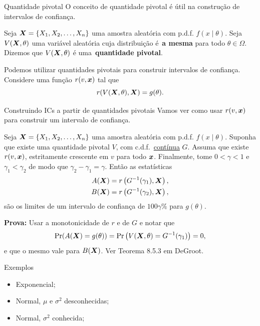 \begin{frame}{Quantidade pivotal}
 O conceito de quantidade pivotal é útil na construção de intervalos de confiança.
 \begin{defn}
 \label{def:pivotal_quantity}
   Seja $\boldsymbol{X} = \{ X_1, X_2, \ldots, X_n \}$ uma amostra aleatória com p.d.f. $f(x\mid \theta)$.
   Seja $V(\boldsymbol{X}, \theta)$ uma variável aleatória cuja distribuição é~\textbf{a mesma} para todo $\theta \in \Omega$.
   Dizemos que $V(\boldsymbol{X}, \theta)$ é uma~\textbf{quantidade pivotal}.
 \end{defn}
Podemos utilizar quantidades pivotais para construir intervalos de confiança.
Considere uma função $r(v, \boldsymbol{x})$ tal que
\[ r(V(\boldsymbol{X}, \theta), \boldsymbol{X}) = g(\theta). \]
\end{frame}

\begin{frame}{Construindo ICs a partir de quantidades pivotais}
 Vamos ver como usar $r(v, \boldsymbol{x})$ para construir um intervalo de confiança.
 \begin{theo}
 \label{thm:CIs_from_pivotal}
     Seja $\boldsymbol{X} = \{ X_1, X_2, \ldots, X_n \}$ uma amostra aleatória com p.d.f. $f(x\mid \theta)$.
     Suponha que existe uma quantidade pivotal $V$, com c.d.f.~\underline{contínua} $G$.
     Assuma que existe $r(v, \boldsymbol{x})$, estritamente crescente em $v$ para todo $\boldsymbol{x}$.
     Finalmente, tome $ 0 < \gamma < 1$ e $\gamma_1 < \gamma_2$ de modo que $\gamma_2 - \gamma_1 = \gamma$.
     Então as estatísticas
     \begin{align*}
      A(\boldsymbol{X}) = r\left(G^{-1}(\gamma_1), \boldsymbol{X} \right),\\
      B(\boldsymbol{X}) = r\left(G^{-1}(\gamma_2), \boldsymbol{X} \right),
     \end{align*}
são os limites de um intervalo de confiança de $100\gamma\%$ para $g(\theta)$.
 \end{theo}
\textbf{Prova:} Usar a monotonicidade de $r$ e de $G$ e notar que 
$$\operatorname{Pr}(A(\boldsymbol{X}) = g(\theta)) = \operatorname{Pr}\left(V(\boldsymbol{X}, \theta) = G^{-1}(\gamma_1)\right) = 0,$$
e que o mesmo vale para $B(\boldsymbol{X})$.
Ver Teorema 8.5.3 em DeGroot.
\end{frame}

\begin{frame}{Exemplos}
 \begin{itemize}
  \item Exponencial;
  \item Normal, $\mu$ e $\sigma^2$ desconhecidas;
  \item Normal, $\sigma^2$ conhecida;
 \end{itemize}
\end{frame}

